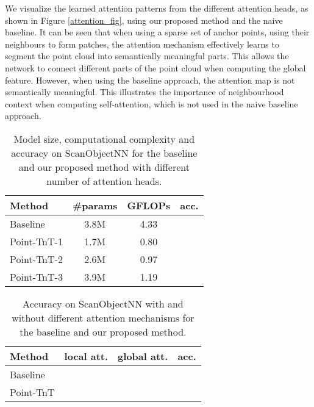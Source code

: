 \documentclass[a4paper,conference]{IEEEtran}
\newcommand{\xmark}{\ding{55}}
\newcommand{\cmark}{\ding{51}}
\begin{document}
We visualize the learned attention patterns from the different attention heads, as shown in Figure \ref{attention_fig}, using our proposed method and the naive baseline. It can be seen that when using a sparse set of anchor points, using their neighbours to form patches, the attention mechanism effectively learns to segment the point cloud into semantically meaningful parts. This allows the network to connect different parts of the point cloud when computing the global feature. However, when using the baseline approach, the attention map is not semantically meaningful. This illustrates the importance of neighbourhood context when computing self-attention, which is not used in the naive baseline approach.


\begin{table}[t]
	\caption{Model size, computational complexity and accuracy on ScanObjectNN for the baseline and our proposed method with different number of attention heads.}
	\centering
	\begin{tabular}{l|ccc}
	\toprule
	\textbf{Method} & \#params & GFLOPs & acc. \\
	\midrule
	Baseline & 3.8M & 4.33 &  \\
	Point-TnT-1 & 1.7M & 0.80 &  \\
	Point-TnT-2 & 2.6M & 0.97 &  \\
	Point-TnT-3 & 3.9M & 1.19 &  \\
	\bottomrule

	\end{tabular}
	\label{tab:dim_ablation}
\end{table}

\begin{table}[t]
	\caption{Accuracy on ScanObjectNN with and without different attention mechanisms for the baseline and our proposed method.}
	\centering
	\begin{tabular}{l|ccc}
	\toprule
	\textbf{Method }& local att. & global att. & acc. \\
	\midrule
	\multirow{2}{*}{Baseline} & & \xmark & \\
	& & \cmark &  \\
	\midrule
	\multirow{4}{*}{Point-TnT} & \xmark & \xmark &  \\
	& \cmark & \xmark &  \\
	& \xmark & \cmark &  \\
	& \cmark & \cmark &  \\
	\bottomrule
	\end{tabular}
	\label{tab:att_ablation}
\end{table}
\end{document}
